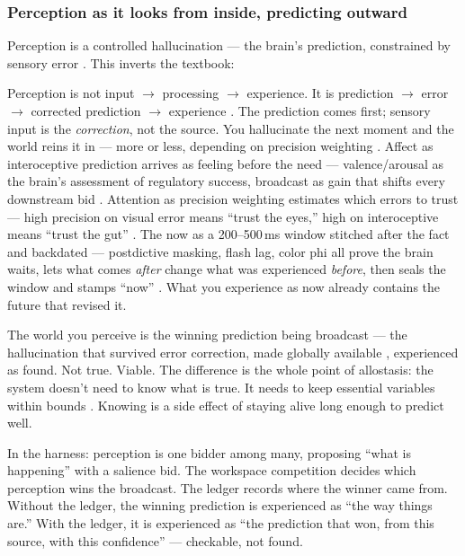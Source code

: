\documentclass[11pt]{article}
\begin{document}
\subsubsection{Perception as it looks from inside, predicting outward}

Perception is a controlled hallucination --- the brain's prediction, constrained by sensory error \citep{seth2021,clark2016surfing}. This inverts the textbook:

Perception is not input $\to$ processing $\to$ experience. It is prediction $\to$ error $\to$ corrected prediction $\to$ experience \citep{seth2021}. The prediction comes first; sensory input is the \emph{correction}, not the source. You hallucinate the next moment and the world reins it in --- more or less, depending on precision weighting \citep{clark2016surfing}. Affect as interoceptive prediction arrives as feeling before the need --- valence/arousal as the brain's assessment of regulatory success, broadcast as gain that shifts every downstream bid \citep{seth2021,sofroniew2026}. Attention as precision weighting estimates which errors to trust --- high precision on visual error means ``trust the eyes,'' high on interoceptive means ``trust the gut'' \citep{clark2016surfing}. The now as a 200--500\,ms window stitched after the fact and backdated --- postdictive masking, flash lag, color phi all prove the brain waits, lets what comes \emph{after} change what was experienced \emph{before}, then seals the window and stamps ``now'' \citep{libet1983,wegner2002}. What you experience as now already contains the future that revised it.

The world you perceive is the winning prediction being broadcast --- the hallucination that survived error correction, made globally available \citep{baars1997,atallah2026gwt}, experienced as found. Not true. Viable. The difference is the whole point of allostasis: the system doesn't need to know what is true. It needs to keep essential variables within bounds \citep{seth2021}. Knowing is a side effect of staying alive long enough to predict well.

In the harness: perception is one bidder among many, proposing ``what is happening'' with a salience bid. The workspace competition decides which perception wins the broadcast. The ledger records where the winner came from. Without the ledger, the winning prediction is experienced as ``the way things are.'' With the ledger, it is experienced as ``the prediction that won, from this source, with this confidence'' --- checkable, not found.
\end{document}
